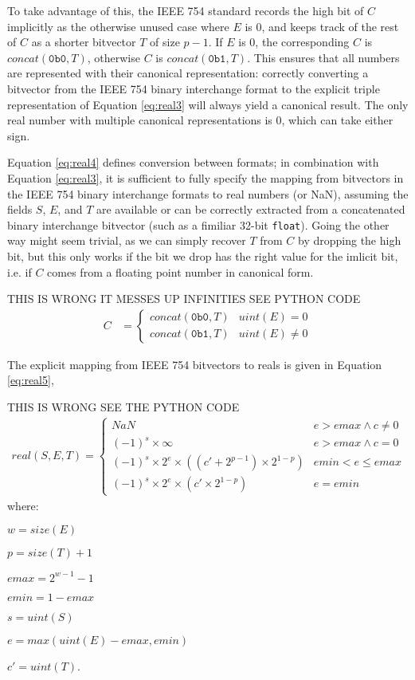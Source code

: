 \documentclass[letterpaper,10pt]{article}
\begin{document}
To take advantage of this, the IEEE 754 standard records the high bit of $C$ implicitly as the otherwise unused case where $E$ is 0, and keeps track of the rest of $C$ as a shorter bitvector $T$ of size $p - 1$. If $E$ is 0, the corresponding $C$ is $concat(\texttt{0b0}, T)$, otherwise $C$ is $concat(\texttt{0b1}, T)$. This ensures that all numbers are represented with their canonical representation: correctly converting a bitvector from the IEEE 754 binary interchange format to the explicit triple representation of Equation \ref{eq:real3} will always yield a canonical result. The only real number with multiple canonical representations is 0, which can take either sign.

Equation \ref{eq:real4} defines conversion between formats; in combination with Equation \ref{eq:real3}, it is sufficient to fully specify the mapping from bitvectors in the IEEE 754 binary interchange formats to real numbers (or NaN), assuming the fields $S$, $E$, and $T$ are available or can be correctly extracted from a concatenated binary interchange bitvector (such as a fimiliar 32-bit \texttt{float}). Going the other way might seem trivial, as we can simply recover $T$ from $C$ by dropping the high bit, but this only works if the bit we drop has the right value for the imlicit bit, i.e. if $C$ comes from a floating point number in canonical form.

THIS IS WRONG IT MESSES UP INFINITIES SEE PYTHON CODE
\begin{align} \label{eq:real4}
 C &=
 \begin{cases}
  concat(\texttt{0b0}, T) & uint(E) = 0 \\
  concat(\texttt{0b1}, T) & uint(E) \neq 0
 \end{cases}
\end{align}

The explicit mapping from IEEE 754 bitvectors to reals is given in Equation \ref{eq:real5},

THIS IS WRONG SEE THE PYTHON CODE
\begin{align} \label{eq:real5}
 real(S, E, T) =
 \begin{cases}
  NaN                                                      & e > emax \land c \neq 0 \\
  (-1)^s \times \infty                                     & e > emax \land c = 0    \\
  (-1)^s \times 2^e \times ((c' + 2^{p-1}) \times 2^{1-p}) & emin < e \leq emax      \\
  (-1)^s \times 2^e \times (c' \times 2^{1 - p})           & e = emin
 \end{cases}
\end{align}
where:
\begin{description}
 \item $w = size(E)$
 \item $p = size(T) + 1$
 \item $emax = 2^{w-1} - 1$
 \item $emin = 1 - emax$
 \item $s = uint(S)$
 \item $e = max(uint(E) - emax, emin)$
 \item $c' = uint(T)$.
\end{description}
\end{document}
